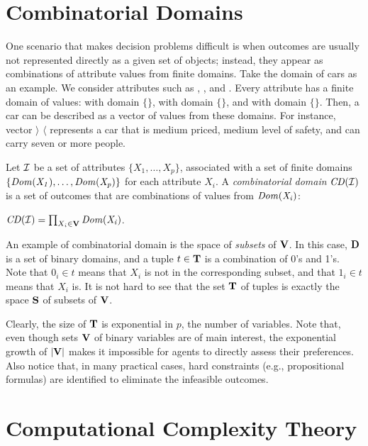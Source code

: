 \section{Combinatorial Domains \label{sec:comb_domains}}
One scenario that makes decision problems difficult is when outcomes
are usually not represented directly as a given set of objects; instead,
they appear as combinations of attribute values from finite domains.
Take the domain of cars as an example.
We consider attributes such as , , and .
Every attribute has a finite domain of values:
 with domain $\{$$\}$,
 with domain $\{$$\}$, and
 with domain $\{$$\}$.
Then, a car can be described as a vector of values from these domains.
For instance, vector $\rangle$  $\langle$ represents
a car that is medium priced, medium level of safety, and can carry seven
or more people.

\begin{definition}
	Let $\mathcal{I}$ be a set of attributes $\{X_1,\ldots,X_p\}$,
	associated with a set of finite domains $\{\it{Dom}(X_1),\ldots,\it{Dom}(X_p)\}$ for each
	attribute $X_i$.
	A \textit{combinatorial domain} $\mathit{CD}(\mathcal{I})$ is a set of outcomes 
	that are combinations of values from $\it{Dom}(X_i)$:
	\begin{center}
		$\mathit{CD}(\mathcal{I}) = \prod_{X_i \in \textbf{V}} \it{Dom}(X_i)$.
	\end{center}
\end{definition}

An example of combinatorial domain is the space of \textit{subsets} of $\textbf{V}$.
In this case, $\textbf{D}$ is a set of binary domains, and a tuple
$t \in \textbf{T}$ is a combination of 0's and 1's.
Note that $0_i \in t$ means that $X_i$ is not in the corresponding subset,
and that $1_i \in t$ means that $X_i$ is.
It is not hard to see that
the set $\textbf{T}$ of tuples is exactly the space $\textbf{S}$ of subsets of $\textbf{V}$.

Clearly, the size of $\textbf{T}$ is exponential in $p$, the number of variables.
Note that, even though sets $\textbf{V}$ of binary variables are of main interest,
the exponential growth of $|\textbf{V}|$ makes it impossible for agents
to directly assess their preferences.
Also notice that, in many practical cases, hard constraints (e.g., propositional
formulas) are identified to eliminate the infeasible outcomes.



\section{Computational Complexity Theory \label{sec:comp_theory}}

